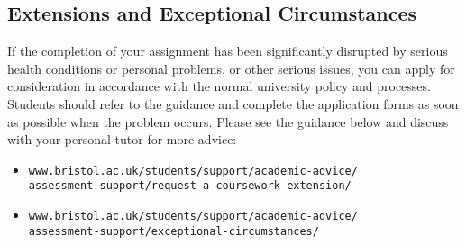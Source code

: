 \documentclass[12pt]{article}
\begin{document}
\subsection*{Extensions and Exceptional Circumstances}

If the completion of your assignment has been significantly disrupted
by serious health conditions or personal problems, or other serious
issues, you can apply for consideration in accordance with the normal
university policy and processes. Students should refer to the guidance
and complete the application forms as soon as possible when the
problem occurs. Please see the guidance below and discuss with your
personal tutor for more advice:
\begin{itemize}
\item \texttt{www.bristol.ac.uk/students/support/academic-advice/\\
  assessment-support/request-a-coursework-extension/}
\item \texttt{www.bristol.ac.uk/students/support/academic-advice/\\assessment-support/exceptional-circumstances/}
    \end{itemize}
\end{document}

